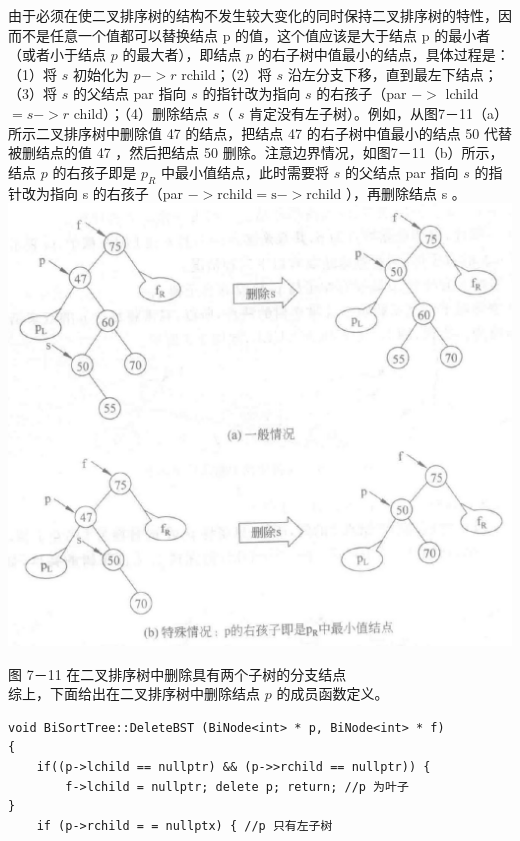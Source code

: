 \documentclass[10pt]{article}
\begin{document}
由于必须在使二叉排序树的结构不发生较大变化的同时保持二叉排序树的特性，因而不是任意一个值都可以替换结点 p 的值，这个值应该是大于结点 p 的最小者（或者小于结点 $p$ 的最大者），即结点 $p$ 的右子树中值最小的结点，具体过程是：（1）将 $s$ 初始化为 $p->r$ rchild；（2）将 $s$ 沿左分支下移，直到最左下结点；（3）将 $s$ 的父结点 par 指向 $s$ 的指针改为指向 $s$ 的右孩子（par $->$ lchild $=s->r$ child）；（4）删除结点 $s$（ $s$ 肯定没有左子树）。例如，从图7－11（a）所示二叉排序树中删除值 47 的结点，把结点 47 的右子树中值最小的结点 50 代替被删结点的值 47 ，然后把结点 50 删除。注意边界情况，如图7－11（b）所示，结点 $p$ 的右孩子即是 $p_{R}$ 中最小值结点，此时需要将 $s$ 的父结点 par 指向 $s$ 的指针改为指向 s 的右孩子（par $->\mathrm{rchild}=\mathrm{s}->\mathrm{rchild}$ ），再删除结点 s 。\\
\includegraphics[max width=\textwidth, center]{2025_06_06_704745ea57b15b2333e5g-243(1)}

图 7－11 在二叉排序树中删除具有两个子树的分支结点\\
综上，下面给出在二叉排序树中删除结点 $p$ 的成员函数定义。

\begin{verbatim}
void BiSortTree::DeleteBST (BiNode<int> * p, BiNode<int> * f)
{
    if((p->lchild == nullptr) && (p->>rchild == nullptr)) {
        f->lchild = nullptr; delete p; return; //p 为叶子
}
    if (p->rchild = = nullptx) { //p 只有左子树
\end{verbatim}
\end{document}
